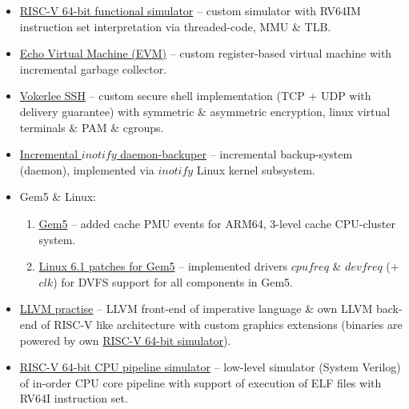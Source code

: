     \begin{itemize}
        \item \href{https://github.com/Vokerlee/riscv64-simulator}
                   {RISC-V 64-bit functional simulator} -- custom simulator with RV64IM instruction set
            interpretation via threaded-code, MMU \& TLB.
        \item \href{https://github.com/Vokerlee/EVM}
                   {Echo Virtual Machine (EVM)} -- custom register-based virtual machine
            with incremental garbage collector.
        \item \href{https://github.com/Vokerlee/VSSH}
                   {Vokerlee SSH} -- custom secure shell implementation (TCP + UDP with delivery guarantee)
            with symmetric \& asymmetric encryption, linux virtual terminals \& PAM \& cgroups.
        \item \href{https://github.com/Vokerlee/linux-api-course/tree/master/5.%20Daemon-backuper}
                   {Incremental $inotify$ daemon-backuper} -- incremental backup-system (daemon), implemented
            via $inotify$ Linux kernel subsystem.
        \item Gem5 \& Linux:
        \begin{enumerate}
            \item \href{https://github.com/Vokerlee/gem5-arm-dev}
                       {Gem5} -- added cache PMU events for ARM64, 3-level cache CPU-cluster system.
            \item \href{https://github.com/Vokerlee/linux-6.1-arm-gem5}
                       {Linux 6.1 patches for Gem5} -- implemented drivers $cpufreq$ \& $devfreq$ (+ $clk$)
                for DVFS support for all components in Gem5.
        \end{enumerate}
        \item \href{https://github.com/Vokerlee/llvm-practice}
                   {LLVM practise} -- LLVM front-end of imperative language \& own LLVM back-end of RISC-V like
            architecture with custom graphics extensions (binaries are powered by own
            \href{https://github.com/Vokerlee/riscv64-simulator/tree/griscv_llvm_sim}{RISC-V 64-bit simulator}).
        \item \href{https://github.com/Vokerlee/cpu-riscv64-pipeline}
                   {RISC-V 64-bit CPU pipeline simulator} -- low-level simulator (System Verilog) of in-order CPU
            core pipeline with support of execution of ELF files with RV64I instruction set.

    \end{itemize}

